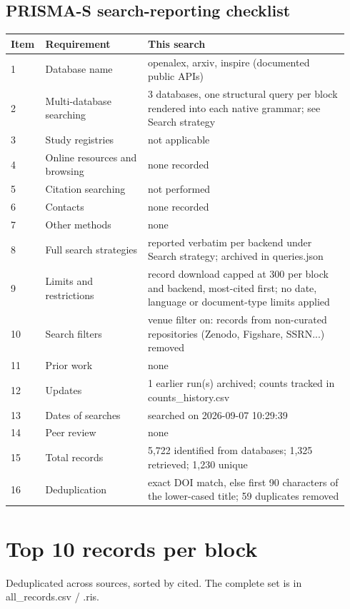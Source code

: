 \documentclass[10pt,a4paper]{article}
\begin{document}
\subsection*{PRISMA-S search-reporting checklist}
{\scriptsize\begin{longtable}{p{0.072\linewidth}p{0.296\linewidth}p{0.574\linewidth}}
\hline
\textbf{Item} & \textbf{Requirement} & \textbf{This search} \\ \hline
\endhead
1 & Database name & openalex, arxiv, inspire (documented public APIs) \\
2 & Multi-database searching & 3 databases, one structural query per block rendered into each native grammar; see Search strategy \\
3 & Study registries & not applicable \\
4 & Online resources and browsing & none recorded \\
5 & Citation searching & not performed \\
6 & Contacts & none recorded \\
7 & Other methods & none \\
8 & Full search strategies & reported verbatim per backend under Search strategy; archived in queries.json \\
9 & Limits and restrictions & record download capped at 300 per block and backend, most-cited first; no date, language or document-type limits applied \\
10 & Search filters & venue filter on: records from non-curated repositories (Zenodo, Figshare, SSRN...) removed \\
11 & Prior work & none \\
12 & Updates & 1 earlier run(s) archived; counts tracked in counts\_history.csv \\
13 & Dates of searches & searched on 2026-09-07 10:29:39 \\
14 & Peer review & none \\
15 & Total records & 5,722 identified from databases; 1,325 retrieved; 1,230 unique \\
16 & Deduplication & exact DOI match, else first 90 characters of the lower-cased title; 59 duplicates removed \\
\hline
\end{longtable}}
\section*{Top 10 records per block}
Deduplicated across sources, sorted by cited. The complete set is in all\_records.csv / .ris.
\end{document}
